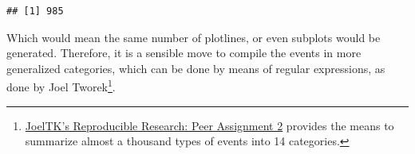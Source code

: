 \documentclass[
]{article}
\newenvironment{Shaded}{\begin{snugshade}}{\end{snugshade}}
\newcommand{\FunctionTok}[1]{\textcolor[rgb]{0.00,0.00,0.00}{#1}}
\newcommand{\NormalTok}[1]{#1}
\newcommand{\SpecialCharTok}[1]{\textcolor[rgb]{0.00,0.00,0.00}{#1}}
\begin{document}
\begin{Shaded}
\end{Shaded}

\begin{verbatim}
## [1] 985
\end{verbatim}

Which would mean the same number of plotlines, or even subplots would be
generated. Therefore, it is a sensible move to compile the events in
more generalized categories, which can be done by means of regular
expressions, as done by Joel Tworek\footnote{\href{https://rpubs.com/JoelTK/205449}{JoelTK's
  Reproducible Research: Peer Assignment 2} provides the means to
  summarize almost a thousand types of events into 14 categories.}.
\end{document}
